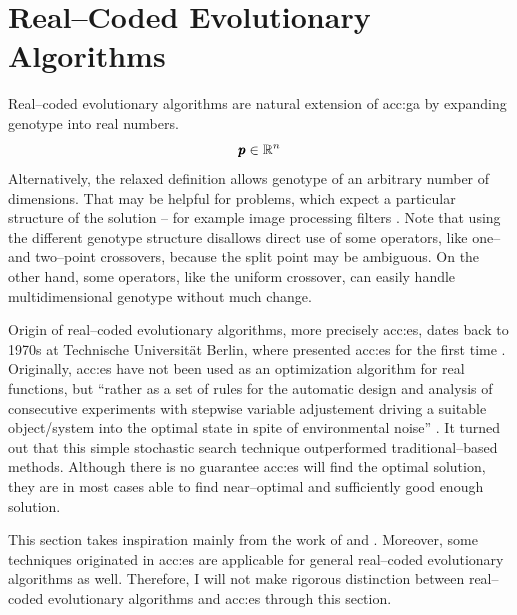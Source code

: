 \section{Real--Coded Evolutionary Algorithms}
\label{chap:realcodedea}

Real--coded evolutionary algorithms are natural extension of \acrshort{acc:ga} by expanding genotype into real numbers.
$$
\pmb{p} \in \mathbb{R}^{n}
$$
Alternatively, the relaxed definition allows genotype of an arbitrary number of dimensions. That may be helpful for problems, which expect a particular structure of the solution -- for example image processing filters \citep{WVDF}. Note that using the different genotype structure disallows direct use of some operators, like one-- and two--point crossovers, because the split point may be ambiguous. On the other hand, some operators, like the uniform crossover, can easily handle multidimensional genotype without much change.

Origin of real--coded evolutionary algorithms, more precisely \acrfull{acc:es}, dates back to 1970s at Technische Universität Berlin, where \citeauthor*{ES-original} presented \acrshort{acc:es} for the first time \citep{ES-original}. Originally, \acrshort{acc:es} have not been used as an optimization algorithm for real functions, but \enquote{rather as a set of rules for the automatic design and analysis of consecutive experiments with stepwise variable adjustement driving a suitable object/system into the optimal state in spite of environmental noise} \citep{EScomprehensiveintroduction}. It turned out that this simple stochastic search technique outperformed traditional--based methods. Although there is no guarantee \acrshort{acc:es} will find the optimal solution, they are in most cases able to find near--optimal and sufficiently good enough solution.

This section takes inspiration mainly from the work of \citet*{IntroductionToEA} and \citet*{EScomprehensiveintroduction}. Moreover, some techniques originated in \acrshort{acc:es} are applicable for general real--coded evolutionary algorithms as well. Therefore, I will not make rigorous distinction between real--coded evolutionary algorithms and \acrshort{acc:es} through this section.

